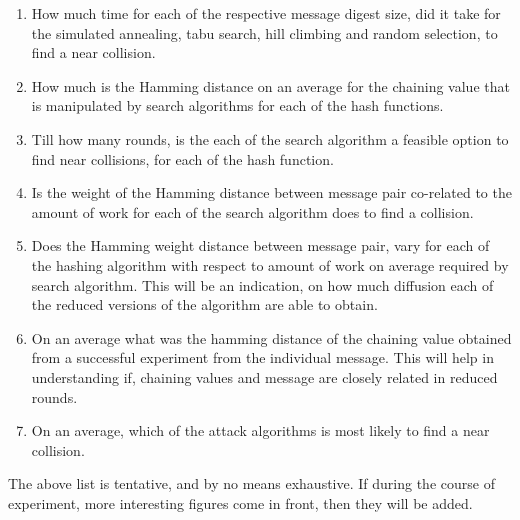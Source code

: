 \documentclass[12pt]{artikel3}                  %
\begin{document}
\begin{enumerate}
  \item How much time for each of the respective message digest size, did it take for the simulated
  annealing, tabu search, hill climbing and random selection, to find a near collision.
  \item How much is the Hamming distance on an average for the chaining value that is manipulated by
  search algorithms for each of the hash functions.
  \item Till how many rounds, is the each of the search algorithm a feasible option to find near 
  collisions, for each of the hash function.
  \item Is the weight of the Hamming distance between message pair co-related to the amount of work
  for each of the search algorithm does to find a collision.
  \item Does the Hamming weight distance between message pair, vary for each of the hashing algorithm
  with respect to amount of work on average required by search algorithm. This will be an
  indication, on how much diffusion each of the reduced versions of the algorithm are able to obtain.
  \item On an average what was the hamming distance of the chaining value obtained from a successful
  experiment from the individual message. This will help in understanding if, chaining values and
  message are closely related in reduced rounds.
  \item On an average, which of the attack algorithms is most likely to find a near collision.
\end{enumerate}

The above list is tentative, and by no means exhaustive. If during the course of experiment, more 
interesting figures come in front, then they will be added.



\end{document}
